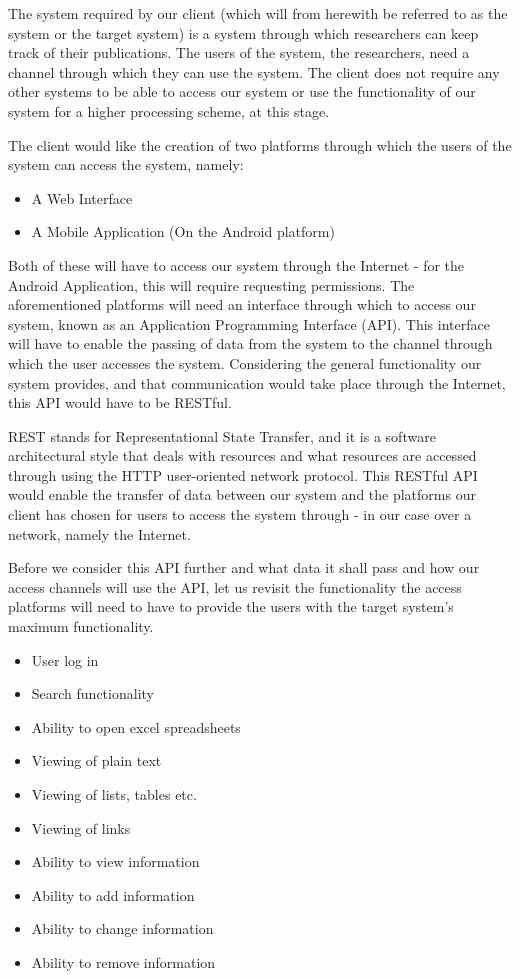 \documentclass[a4paper,12pt]{article}
\begin{document}
The system required by our client (which will from herewith be referred to as the system or the target system) is a system through which researchers can keep track of their publications. The users of the system, the researchers, need a channel through which they can use the system. The client does not require any other systems to be able to access our system or use the functionality of our system for a higher processing scheme, at this stage.

The client would like the creation of two platforms through which the users of the system can access the system, namely:
\begin{itemize}
	\item A Web Interface
	\item A Mobile Application (On the Android platform)
\end{itemize}

Both of these will have to access our system through the Internet - for the Android Application, this will require requesting permissions. The aforementioned platforms will need an interface through which to access our system, known as an Application Programming Interface (API). This interface will have to enable the passing of data from the system to the channel through which the user accesses the system. Considering the general functionality our system provides, and that communication would take place through the Internet, this API would have to be RESTful.

REST stands for Representational State Transfer, and it is a software architectural style that deals with resources and what resources are accessed through using the HTTP user-oriented network protocol. This RESTful API would enable the transfer of data between our system and the platforms our client has chosen for users to access the system through - in our case over a network, namely the Internet.

Before we consider this API further and what data it shall pass and how our access channels will use the API, let us revisit the functionality the access platforms will need to have to provide the users with the target system's maximum functionality.
\begin{itemize}
	\item User log in
	\item Search functionality
	\item Ability to open excel spreadsheets
	\item Viewing of plain text
	\item Viewing of lists, tables etc.
	\item Viewing of links
	\item Ability to view information
	\item Ability to add information
	\item Ability to change information
	\item Ability to remove information
\end{itemize}
\end{document}
